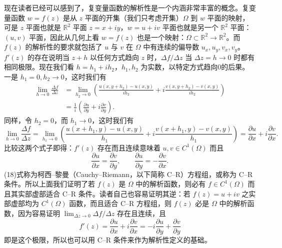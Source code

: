 现在读者已经可以感到了，复变量函数的解析性是一个内涵非常丰富的概念。复变量函数 $w=f(z)$ 是从 $z$ 平面的开集（我们只考虑开集）$\Omega$ 到 $w$ 平面的映射，可是 $z$ 平面也就是 $\mathbb R^2$ 平面 $z=x+iy$，$w=u+iv$ 平面也就是另一个 $\mathbb R^2$ 平面：$(u,v)$ 平面，因此从几何上看 $w=f(z)$ 也是一个映射：$\Omega\subset\mathbb R^2\to\mathbb R^2$。而 $f(z)$ 的解析性的要求就包括了 $u$ 与 $v$ 在 $\Omega$ 中有连续的偏导数 $u_x,u_y,v_x,v_y$。$f'(z)$ 的存在说明当 $z+h$ 以任何方式趋向 $z$ 时，$\Delta f/\Delta z$ 当 $\Delta z=h\to0$ 时都有相同极限。现在我们看 $h=h_1+ih_2$，$h_1,h_2$ 为实数，以特定方式趋向0的后果。一是 $h_1=0,h_2\to0$，这时我们有
\[
\begin{aligned}
 \lim_{h\to0}\frac{\Delta f}{\Delta z}
 &=\lim_{h_2\to0}\left(
 \frac{u(x,y+h_2)-u(x,y)}{ih_2}
 +i\frac{v(x,y+h_2)-v(x,y)}{ih_2}\right)\\
 &=\frac1i\left(\frac{\partial u}{\partial y}+i\frac{\partial v}{\partial y}\right).
\end{aligned}
\]
同样，令 $h_2=0$，而 $h_1\to0$，这时我们有
\[
 \lim_{h\to0}\frac{\Delta f}{\Delta z}
 =\lim_{h_1\to0}\left(
 \frac{u(x+h_1,y)-u(x,y)}{h_1}
 +i\frac{v(x+h_1,y)-v(x,y)}{h_1}\right)
 =\frac{\partial u}{\partial x}+i\frac{\partial v}{\partial x}.
\]
比较这两个式子即得：$f'(z)$ 存在而且连续意味着 $u,v\in C^1(\Omega)$ 而且
\begin{equation}
 \frac{\partial u}{\partial x}=\frac{\partial v}{\partial y},\qquad
 \frac{\partial u}{\partial y}=-\frac{\partial v}{\partial x}.
 \tag{18}
\end{equation}
(18)式称为柯西--黎曼（Cauchy--Riemann，以下简称 C--R）方程组，或称为 C--R 条件。所以上面我们证明了若 $f(z)$ 是 $\Omega$ 中的解析函数，则必有 $f\in C^1(\Omega)$ 而且其实部虚部适合 C--R 条件。读者自己也容易证明其逆：若 $f(z)=u+iv$ 之实部虚部均为 $C^1(\Omega)$ 函数，而且适合 C--R 方程组，则 $f(z)$ 必是 $\Omega$ 中的解析函数，因为容易证明 $\lim_{\Delta z\to0}\Delta f/\Delta z$ 存在且连续，且
\[
 f'(z)=\frac{\partial u}{\partial x}+i\frac{\partial v}{\partial x}
 =-i\frac{\partial u}{\partial y}+\frac{\partial v}{\partial y}
\]
即是这个极限，所以也可以用 C--R 条件来作为解析性定义的基础。

